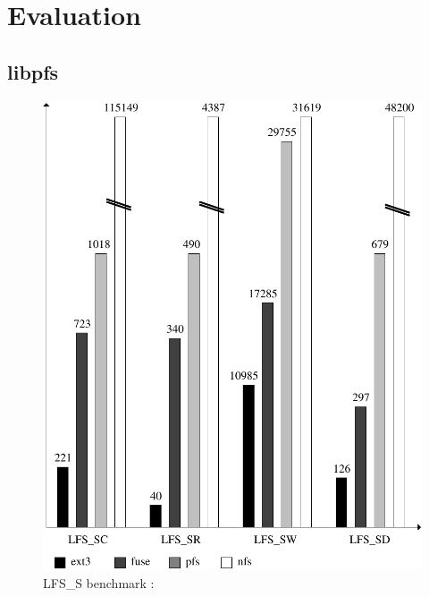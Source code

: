 
\section{Evaluation}
\label{sec:eval}


\subsection{libpfs}

\begin{figure}[ht]
\begin{center}
  \includegraphics [scale=0.55] {fig/lfs_s}
  \caption{\label{LfsS}
    {\small LFS\_S benchmark : }}
\end{center}
\end{figure}

